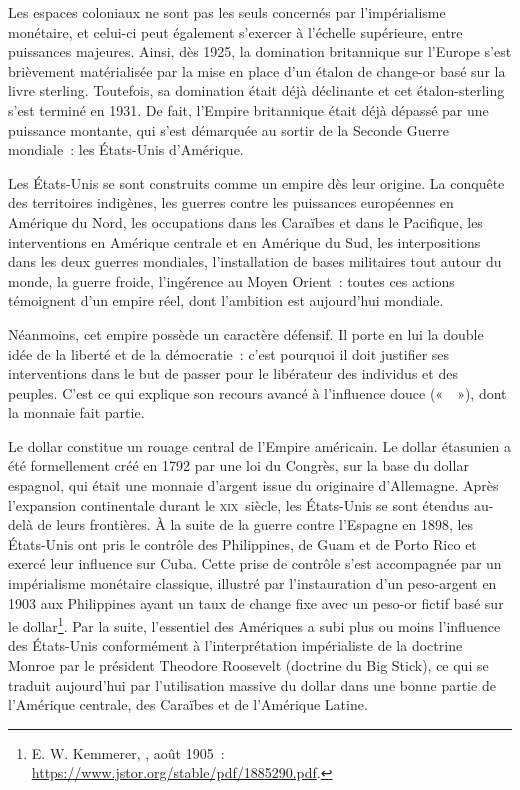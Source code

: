 
Les espaces coloniaux ne sont pas les seuls concernés par l'impérialisme monétaire, et celui-ci peut également s'exercer à l'échelle supérieure, entre puissances majeures. Ainsi, dès 1925, la domination britannique sur l'Europe s'est brièvement matérialisée par la mise en place  d'un étalon de change-or basé sur la livre sterling. Toutefois, sa domination était déjà déclinante et cet étalon-sterling s'est terminé en 1931. De fait, l'Empire britannique était déjà dépassé par une puissance montante, qui s'est démarquée au sortir de la Seconde Guerre mondiale~: les États-Unis d'Amérique.


Les États-Unis se sont construits comme un empire dès leur origine. La conquête des territoires indigènes, les guerres contre les puissances européennes en Amérique du Nord, les occupations dans les Caraïbes et dans le Pacifique, les interventions en Amérique centrale et en Amérique du Sud, les interpositions dans les deux guerres mondiales, l'installation de bases militaires tout autour du monde, la guerre froide, l'ingérence au Moyen Orient~: toutes ces actions témoignent d'un empire réel, dont l'ambition est aujourd'hui mondiale.

Néanmoins, cet empire possède un caractère défensif. Il porte en lui la double idée de la liberté et de la démocratie~: c'est pourquoi il doit justifier ses interventions dans le but de passer pour le libérateur des individus et des peuples. C'est ce qui explique son recours avancé à l'influence douce («~~»), dont la monnaie fait partie.  %

Le dollar constitue un rouage central de l'Empire américain. Le dollar étasunien a été formellement créé en 1792 par une loi du Congrès, sur la base du dollar espagnol, qui était une monnaie d'argent issue du  originaire d'Allemagne. Après l'expansion continentale durant le \textsc{xix}\ieme{}~siècle, les États-Unis se sont étendus au-delà de leurs frontières. À la suite de la guerre contre l'Espagne en 1898, les États-Unis ont pris le contrôle des Philippines, de Guam et de Porto Rico et exercé leur influence sur Cuba. Cette prise de contrôle s'est accompagnée par un impérialisme monétaire classique, illustré par l'instauration d'un peso-argent en 1903 aux Philippines ayant un taux de change fixe avec un peso-or fictif basé sur le dollar\footnote{E. W. Kemmerer, , août 1905~: \url{https://www.jstor.org/stable/pdf/1885290.pdf}.}. Par la suite, l'essentiel des Amériques a subi plus ou moins l'influence des États-Unis conformément à l'interprétation impérialiste de la doctrine Monroe par le président Theodore Roosevelt (doctrine du Big Stick), ce qui se traduit aujourd'hui par l'utilisation massive du dollar dans une bonne partie de l'Amérique centrale, des Caraïbes et de l'Amérique Latine.

